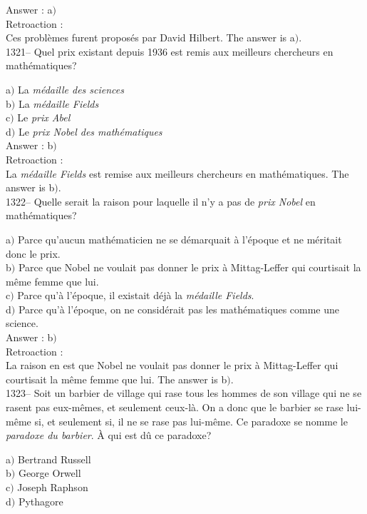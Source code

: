 ﻿\documentclass[letterpaper, 12pt]{article}
\begin{document}
Answer : a$)$\\

Retroaction : \\
Ces probl\`emes furent propos\'es par David Hilbert.
The answer is  a$)$.\\

1321-- Quel prix existant depuis 1936 est remis aux meilleurs
chercheurs en math\'ematiques?

a$)$ La {\sl m\'edaille des sciences} \\
b$)$ La {\sl m\'edaille Fields} \\
c$)$ Le {\sl prix Abel} \\
d$)$ Le {\sl prix Nobel des math\'ematiques}\\

Answer : b$)$\\

Retroaction : \\
La {\sl m\'edaille Fields} est remise aux meilleurs chercheurs en
math\'ematiques.
The answer is  b$)$.\\

1322-- Quelle serait la raison pour laquelle il n'y a pas de {\sl
prix Nobel} en math\'ematiques?

a$)$ Parce qu'aucun math\'ematicien ne se d\'emarquait \`a l'\'epoque et ne
m\'eritait donc le prix. \\
b$)$ Parce que Nobel ne voulait pas donner le prix \`a Mittag-Leffer qui
courtisait la m\^eme femme que lui. \\
c$)$ Parce qu'\`a l'\'epoque, il existait d\'ej\`a la {\sl m\'edaille
Fields}. \\
d$)$ Parce qu'\`a l'\'epoque, on ne consid\'erait pas les math\'ematiques
comme une science. \\

Answer : b$)$\\

Retroaction : \\
La raison en est que Nobel ne voulait pas donner le prix \`a
Mittag-Leffer qui courtisait la m\^eme femme que lui.
The answer is  b$)$.\\

1323-- Soit un barbier de village qui rase tous les hommes de son
village qui ne se rasent pas eux-m\^emes, et seulement ceux-l\`a. On
a donc que le barbier se rase lui-m\^eme si, et seulement si, il ne
se rase pas lui-m\^eme. Ce paradoxe se nomme le {\sl paradoxe du
barbier}. \`A qui est d\^u ce paradoxe?

a$)$ Bertrand Russell \\
b$)$ George Orwell \\
c$)$ Joseph Raphson \\
d$)$ Pythagore\\
\end{document}
